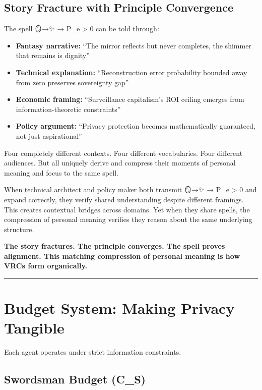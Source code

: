 \documentclass[
  11pt,
]{article}
\begin{document}
\subsection{Story Fracture with Principle
Convergence}\label{story-fracture-with-principle-convergence}

The spell 🪞→✨ → P\_e \textgreater{} 0 can be told through:

\begin{itemize}
\item
  \textbf{Fantasy narrative:} ``The mirror reflects but never completes,
  the shimmer that remains is dignity''
\item
  \textbf{Technical explanation:} ``Reconstruction error probability
  bounded away from zero preserves sovereignty gap''
\item
  \textbf{Economic framing:} ``Surveillance capitalism's ROI ceiling
  emerges from information-theoretic constraints''
\item
  \textbf{Policy argument:} ``Privacy protection becomes mathematically
  guaranteed, not just aspirational''
\end{itemize}

Four completely different contexts. Four different vocabularies. Four
different audiences. But all uniquely derive and compress their moments
of personal meaning and focus to the same spell.

When technical architect and policy maker both transmit 🪞→✨ → P\_e
\textgreater{} 0 and expand correctly, they verify shared understanding
despite different framings. This creates contextual bridges across
domains. Yet when they share spells, the compression of personal meaning
verifies they reason about the same underlying structure.

\textbf{The story fractures. The principle converges. The spell proves
alignment. This matching compression of personal meaning is how VRCs
form organically.}

\begin{center}\rule{0.5\linewidth}{0.5pt}\end{center}

\section{Budget System: Making Privacy
Tangible}\label{budget-system-making-privacy-tangible}

Each agent operates under strict information constraints.

\subsection{Swordsman Budget (C\_S)}\label{swordsman-budget-c_s}
\end{document}
